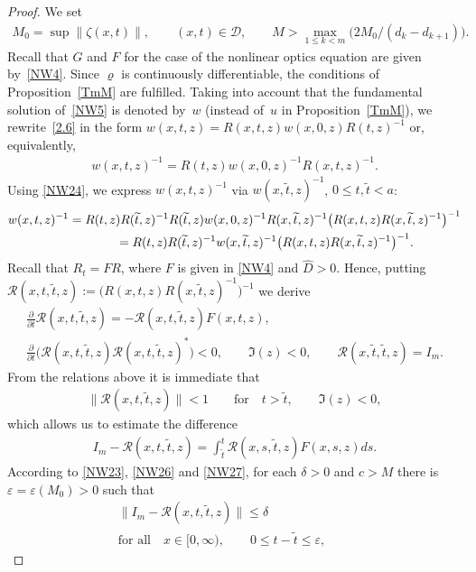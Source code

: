 \documentclass[pdftex]{sigma}
\def\vr{\varrho}
\def\ve{\varepsilon}
\def\wh{\widehat}
\def\wt{\widetilde}
\def\prt{\partial}
\newcommand{\cD}{{\mathcal D}}
\newcommand{\cR}{{\mathcal R}}
\numberwithin{equation}{section}
\begin{document}
\begin{proof} We set
\begin{gather} \label{NW23}
M_0=\sup\| \zeta(x,t)\|, \qquad (x,t)\in \cD, \qquad M>\max_{1\leq k<m}\big(2M_0/(d_k-d_{k+1})\big).
\end{gather}
Recall that $G$ and $F$ for the case of the nonlinear optics equation are given by~\eqref{NW4}. Since $\vr$ is continuously dif\/ferentiable, the conditions of Proposition~\ref{TmM}
are fulf\/illed. Taking into account that the fundamental solution of~\eqref{NW5} is denoted by~$w$
(instead of~$u$ in Proposition~\ref{TmM}), we rewrite~\eqref{2.6} in the form
$w(x,t,z)=R(x,t,z)w(x,0,z)R(t,z)^{-1}$ or, equivalently,
\begin{gather} \label{NW24}
w(x,t,z)^{-1}=R(t,z)w(x,0,z)^{-1}R(x,t,z)^{-1}.
\end{gather}
Using \eqref{NW24}, we express $w(x,t,z)^{-1}$ via $w(x,\wt t,z)^{-1}$, $0 \leq t,\wt t <a$:
\begin{gather}
w(x,t,z)^{-1} =R(t,z)R(\wt t,z)^{-1}R(\wt t,z)w(x,0,z)^{-1}R(x,\wt t,z)^{-1}\big(R(x,t,z)R(x,\wt t,z)^{-1}\big)^{-1}\nonumber\\
 \label{NW25}
 \hphantom{w(x,t,z)^{-1}}{}
 =R(t,z)R(\wt t,z)^{-1}w(x,\wt t,z)^{-1}\big(R(x,t,z)R(x,\wt t,z)^{-1}\big)^{-1}.
\end{gather}
Recall that $R_t=FR$, where $F$ is given in \eqref{NW4} and $\wh D>0$. Hence, putting $\cR(x,t, \wt t, z):=\big(R(x,t,z)R(x,\wt t,z)^{-1}\big)^{-1}$ we derive
\begin{gather*}
\frac{\prt}{\prt t} \cR(x,t, \wt t, z)=-\cR(x,t, \wt t, z)F(x,t,z), \\
\frac{\prt}{\prt t} \big(\cR(x,t, \wt t, z)\cR(x,t, \wt t, z)^*)<0, \qquad \Im(z)<0 , \qquad
 \cR(x,\wt t, \wt t, z)=I_m.
\end{gather*}
From the relations above it is immediate that
\begin{gather} \label{NW26}
\|\cR(x, t, \wt t, z)\|<1 \qquad {\mathrm{for}}\quad t>\wt t, \qquad \Im(z)<0,
\end{gather}
which allows us to estimate the dif\/ference
\begin{gather} \label{NW27}
I_m-\cR(x, t, \wt t, z)=\int_{\wt t}^t \cR(x, s, \wt t, z)F(x,s,z)ds.
\end{gather}
According to \eqref{NW23}, \eqref{NW26} and \eqref{NW27}, for each $\delta >0$ and $c>M$ there is $\ve=\ve(M_0)>0$ such that
\begin{gather} \label{NW28}
\| I_m-\cR(x, t, \wt t, z)\| \leq \delta
\\ \nonumber \text{for all} \quad x\in [0, \infty), \qquad \! 0\leq t-\wt t \leq \ve,\qquad\!

\end{gather}
\end{proof}
\end{document}
